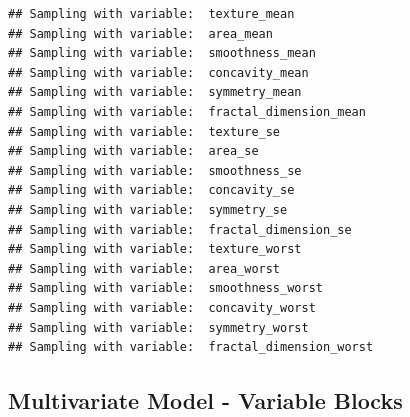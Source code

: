 \documentclass[
]{article}
\newenvironment{Shaded}{\begin{snugshade}}{\end{snugshade}}
\newcommand{\CharTok}[1]{\textcolor[rgb]{0.31,0.60,0.02}{#1}}
\newcommand{\CommentTok}[1]{\textcolor[rgb]{0.56,0.35,0.01}{\textit{#1}}}
\newcommand{\ControlFlowTok}[1]{\textcolor[rgb]{0.13,0.29,0.53}{\textbf{#1}}}
\newcommand{\DataTypeTok}[1]{\textcolor[rgb]{0.13,0.29,0.53}{#1}}
\newcommand{\DecValTok}[1]{\textcolor[rgb]{0.00,0.00,0.81}{#1}}
\newcommand{\KeywordTok}[1]{\textcolor[rgb]{0.13,0.29,0.53}{\textbf{#1}}}
\newcommand{\NormalTok}[1]{#1}
\newcommand{\OperatorTok}[1]{\textcolor[rgb]{0.81,0.36,0.00}{\textbf{#1}}}
\newcommand{\StringTok}[1]{\textcolor[rgb]{0.31,0.60,0.02}{#1}}
\begin{document}
\begin{Shaded}
\end{Shaded}

\begin{verbatim}
## Sampling with variable:  texture_mean 
## Sampling with variable:  area_mean 
## Sampling with variable:  smoothness_mean 
## Sampling with variable:  concavity_mean 
## Sampling with variable:  symmetry_mean 
## Sampling with variable:  fractal_dimension_mean 
## Sampling with variable:  texture_se 
## Sampling with variable:  area_se 
## Sampling with variable:  smoothness_se 
## Sampling with variable:  concavity_se 
## Sampling with variable:  symmetry_se 
## Sampling with variable:  fractal_dimension_se 
## Sampling with variable:  texture_worst 
## Sampling with variable:  area_worst 
## Sampling with variable:  smoothness_worst 
## Sampling with variable:  concavity_worst 
## Sampling with variable:  symmetry_worst 
## Sampling with variable:  fractal_dimension_worst
\end{verbatim}

\hypertarget{multivariate-model---variable-blocks}{%
\subsection{Multivariate Model - Variable
Blocks}\label{multivariate-model---variable-blocks}}
\end{document}
